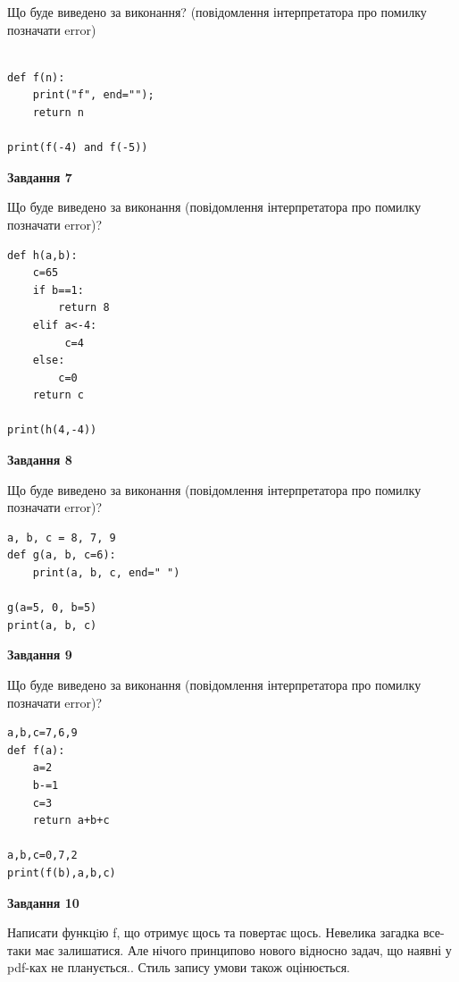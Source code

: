 \documentclass[12pt, ukrainian]{article}
\begin{document}
{\begin {large}
Що буде виведено за виконання? (повідомлення інтерпретатора про помилку позначати error)\par
\begin{verbatim}

def f(n):
    print("f", end="");
    return n

print(f(-4) and f(-5))
\end{verbatim}

{\begin {center}\textbf{Завдання 7}\end {center}}

Що буде виведено за виконання (повідомлення інтерпретатора про помилку позначати error)?\par
\begin{verbatim}
def h(a,b):
    c=65
    if b==1:
        return 8
    elif a<-4:
         c=4
    else: 
        c=0
    return c

print(h(4,-4))
\end{verbatim}

{\begin {center}\textbf{Завдання 8}\end {center}}

Що буде виведено за виконання (повідомлення інтерпретатора про помилку позначати error)?\par
\begin{verbatim}
a, b, c = 8, 7, 9
def g(a, b, c=6):
    print(a, b, c, end=" ")

g(a=5, 0, b=5)
print(a, b, c)
\end{verbatim}

{\begin {center}\textbf{Завдання 9}\end {center}}

Що буде виведено за виконання (повідомлення інтерпретатора про помилку позначати error)?\par
\begin{verbatim}
a,b,c=7,6,9
def f(a):
    a=2
    b-=1
    c=3
    return a+b+c

a,b,c=0,7,2
print(f(b),a,b,c)
\end{verbatim}

{\begin {center}\textbf{Завдання 10}\end {center}}


Написати функцiю f, що отримує щось та повертає щось. Невелика загадка все-таки має залишатися. Але нічого принципово нового відносно задач, що наявні у pdf-ках не планується.. Стиль запису умови також оцінюється.\par
\end {large}}
\newpage
\end{document}
